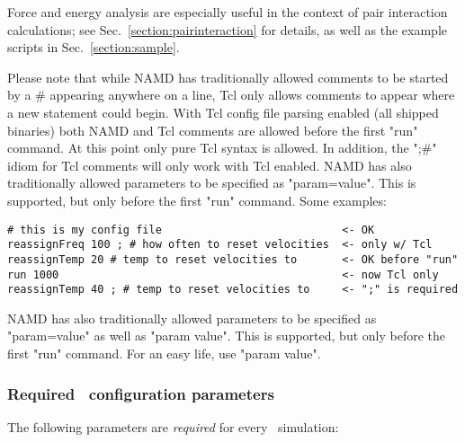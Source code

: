 \begin{itemize}
    Force and energy analysis are especially useful in the context of 
    pair interaction calculations; see Sec.~\ref{section:pairinteraction}
    for details, as well as the example scripts in Sec.~\ref{section:sample}.
\end{itemize}

Please note that while NAMD has traditionally allowed comments to be
started by a \# appearing anywhere on a line, Tcl only allows comments
to appear where a new statement could begin.  With Tcl config file
parsing enabled (all shipped binaries) both NAMD and Tcl comments are
allowed before the first "run" command.  At this point only pure Tcl
syntax is allowed.  In addition, the ";\#" idiom for Tcl comments will
only work with Tcl enabled.  NAMD has also traditionally allowed
parameters to be specified as "param=value".  This is supported, but
only before the first "run" command.  Some examples:

\begin{verbatim}
# this is my config file                            <- OK
reassignFreq 100 ; # how often to reset velocities  <- only w/ Tcl
reassignTemp 20 # temp to reset velocities to       <- OK before "run"
run 1000                                            <- now Tcl only
reassignTemp 40 ; # temp to reset velocities to     <- ";" is required
\end{verbatim}

NAMD has also traditionally allowed parameters to be specified as
"param=value" as well as "param value".  This is supported, but only
before the first "run" command.  For an easy life, use "param value".

\subsubsection{Required \NAMD\ configuration parameters}
\label{section:requiredparams}

The following parameters are {\em required} for every
\NAMD\ simulation:

